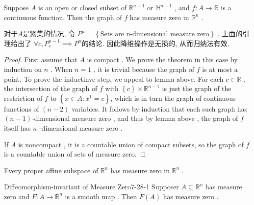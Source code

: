 \documentclass[../main.tex]{subfiles}
\begin{document}
\begin{proposition}{}{}
    Suppose \(  A  \) is an open or closed subset of \(  \mathbb{R} ^{n-1}  \) or \(  \mathbb{H}^{n-1}  \) , and \(  f: A\to \mathbb{R}   \) is a continuous function. Then the graph of \(  f  \) has measure zero in \(  \mathbb{R} ^{n}  \) .       
\end{proposition}
\begin{proofsketch}
    对于\(  A  \)是紧集的情况, 令 \(  P^{n}= \left\{\text{Sets are n-dimensional measure zero}  \right\}  \) .  上面的引理给出了 \(  \forall c, P_{c}^{n-1} \implies  P^{n}  \)的结论.  因此降维操作是无损的, 从而归纳法有效. 
\end{proofsketch}
\begin{proof}
    First assume that \(  A  \) is compact .  We prove the theorem in this case by induction on \(  n   \) . When \(  n = 1  \) , it is trivial because the graph of \(  f  \) is at most a point.  To prove the inductinve step, we appeal to lemma above. For each \(  c \in \mathbb{R}   \) , the intersection of the graph of \(  f  \) with \(  \left\{ c \right\}\times \mathbb{R} ^{n-1}  \) is just the graph of the restriction of \(  f  \) to \(  \left\{  x \in A:x^{1}= c \right\}  \),     which is in turn the graph of continuous functions of \(  \left( n-2 \right)   \) variables. It follows by induction that each such graph has \(  \left( n-1 \right)   \)-dimensional measure zero , and thus by lemma above , the graph of \(  f  \) itself has \(  n  \) -dimensional measure zero . 

    If \(  A  \) is noncompact , it is a  countable union of compact subsets, so the graph of \(  f  \) is a countable union of sets of measure zero.  
\end{proof}

\begin{corollary}{}{}
    Every proper affine subspace of \(  \mathbb{R} ^{n}  \) has measure zero in \(  \mathbb{R} ^{n}  \) .   
\end{corollary}

\begin{proposition}{Diffeomorphism-invariant of Measure Zero}{7-28-1}
    Supposer \(  A\subseteq \mathbb{R} ^{n}  \) has measure zero and \(  F: A\to \mathbb{R} ^{n}  \) is a smooth map . Then \(  F\left( A \right)   \) has measure zero .    
\end{proposition}
\end{document}
